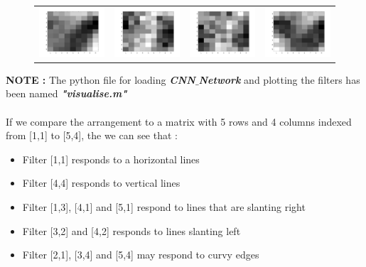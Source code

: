 \documentclass{article} %
\begin{document}
\begin{figure}[H]
\begin{tabular}{cccc}
\\
\includegraphics[width=0.2\linewidth]{images/Fig_grey_17.png}
&
\includegraphics[width=0.2\linewidth]{images/Fig_grey_18.png}
&
\includegraphics[width=0.2\linewidth]{images/Fig_grey_19.png}
&
\includegraphics[width=0.2\linewidth]{images/Fig_grey_20.png}
\end{tabular}
\end{figure}



\textbf{NOTE : }The python file for loading \textbf{\textit{CNN$\_$Network}} and plotting the filters has been named \textbf{\textit{"visualise.m"}}\\\\

If we compare the arrangement to a matrix with 5 rows and 4 columns indexed from [1,1] to [5,4], the we can see that :
\begin{itemize}
    \item Filter [1,1] responds to a horizontal lines
    \item Filter [4,4] responds to vertical lines
    \item Filter [1,3], [4,1] and [5,1] respond to lines that are slanting right
    \item Filter [3,2] and [4,2] responds to lines slanting left
    \item Filter [2,1], [3,4] and [5,4] may respond to curvy edges
\end{itemize}

\newpage
\end{document}
